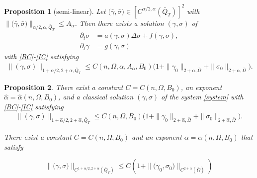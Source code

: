 \documentclass[a4paper,11pt]{article}
\newtheorem{proposition}{Proposition}[section]
\theoremstyle{remark}
\begin{document}
\begin{proposition}[semi-linear] Let $\big(\bar{\gamma},\bar{\sigma}\big) \in \left[C^{\alpha/2,\alpha}(\bar{Q}_T)\right]^2$ with $\|\big(\bar\gamma,\bar\sigma\big)\|_{\alpha/2,\alpha,\bar{Q}_T} \le A_\alpha$. Then there exists a solution $(\gamma,\sigma)$ of
\begin{equation}
\begin{aligned}
 \partial_t \sigma &= a(\bar\gamma,\bar\sigma) \Delta \sigma + f(\gamma,\sigma) ,\\
 \partial_t \gamma &= g(\gamma,\sigma) 
\end{aligned}
\end{equation}
with \eqref{BC}-\eqref{IC} satisfying
\begin{align*}
 \|(\gamma,\sigma)\|_{1+\alpha/2, 2+\alpha,\bar{Q}_T} \le C(n,\Omega,\alpha,A_\alpha,B_0) \Big(1 + \|\gamma_0\|_{2+\alpha,\bar\Omega} +  \|\sigma_0\|_{2+\alpha,\bar\Omega}\Big).
\end{align*}
\end{proposition}

\begin{proposition} There exist a constant $C = C(n,\Omega,B_0)$, an exponent $\hat\alpha = \hat\alpha(n,\Omega,B_0)$, and a classical solution $(\gamma,\sigma)$ of the system \eqref{system} with \eqref{BC}-\eqref{IC} satisfying
\begin{align*}
 \|(\gamma,\sigma)\|_{1+\hat\alpha/2, 2+\hat\alpha,\bar{Q}_T} \le C(n,\Omega,B_0) \Big(1 + \|\gamma_0\|_{2+\hat\alpha,\bar\Omega} +  \|\sigma_0\|_{2+\hat\alpha,\bar\Omega}\Big).
\end{align*}





 There exist a constant $C = C(n,\Omega,B_0)$ and an exponent $\alpha = \alpha(n,\Omega,B_0)$ that satisfy
 
  \begin{equation}
  \|\big(\gamma,\sigma\big)\|_{C^{1+\alpha/2, 2+ \alpha}(\bar{Q}_T)} \le C \left( 1+  \|\big(\gamma_0,\sigma_0\big)\|_{C^{2+ \alpha}(\bar{\Omega})} \right)
 \end{equation}
 

\end{proposition}
\end{document}
